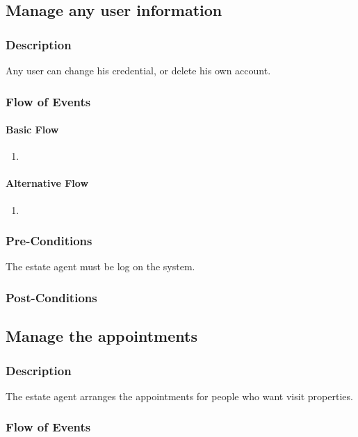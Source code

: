 \documentclass[a4paper,12pt]{article}
\begin{document}
\subsection{Manage any user information}
\subsubsection{Description}
Any user can change his credential, or delete his own account.
\subsubsection{Flow of Events}
\paragraph{Basic Flow}
\begin{enumerate}
\item
\end{enumerate}
\paragraph{Alternative Flow}
\begin{enumerate}
\item
\end{enumerate}
\subsubsection{Pre-Conditions}
The estate agent must be log on the system.
\subsubsection{Post-Conditions}

\subsection{Manage the appointments}
\subsubsection{Description}
The estate agent arranges the appointments for people who want visit properties.
\subsubsection{Flow of Events}
\end{document}
